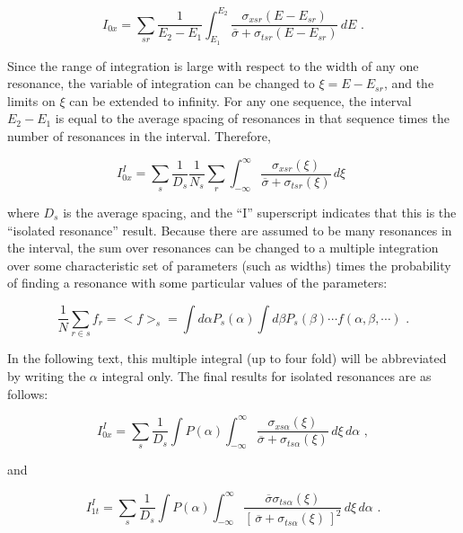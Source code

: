 \begin{equation}
   I_{0x}=\sum_{sr}\frac{1}{E_2-E_1}
     \int_{E_1}^{E_2}\frac{\sigma_{xsr}(E-E_{sr})}
       {\overline{\sigma}+\sigma_{tsr}(E-E_{sr})}\,dE\,\,.
\end{equation}

\noindent
Since the range of integration is large with respect to the width
of any one resonance, the variable of integration can be changed to
$\xi{=}E{-}E_{sr}$, and the limits on $\xi$ can be extended to
infinity.  For any one sequence, the interval $E_2{-}E_1$ is
equal to the average spacing of resonances in that sequence times
the number of resonances in the interval.  Therefore,

\begin{equation}
   I^I_{0x}=\sum_s\frac{1}{D_s}
    \frac{1}{N_s}\sum_r\int_{-\infty}^\infty
      \frac{\sigma_{xsr}(\xi)}
       {\overline{\sigma}+\sigma_{tsr}(\xi)} \,d\xi\,\,
\end{equation}

\noindent
where $D_s$ is the average spacing, and the ``I'' superscript
indicates that this is the ``isolated resonance'' result.
Because there are assumed to be many resonances in the interval,
the sum over resonances can be changed to a multiple integration
over some characteristic set of parameters (such as widths) times
the probability of finding a resonance with some particular
values of the parameters:

\begin{equation}
   \frac{1}{N}\sum_{r\in s}f_r={<}f{>}_s=
    \int d\alpha P_s(\alpha)\int d\beta P_s(\beta)\cdots
         f(\alpha,\beta,\cdots)\,\,.
\end{equation}

\noindent
In the following text, this multiple integral (up to four fold)
will be abbreviated by writing the $\alpha$ integral only.
The final results for isolated resonances are as follows:

\begin{equation}
   I^I_{0x}=\sum_s\frac{1}{D_s}\int P(\alpha)
     \int_{-\infty}^\infty\frac{\sigma_{xs\alpha}(\xi)}
       {\overline{\sigma}+\sigma_{ts\alpha}(\xi)}\,d\xi\,d\alpha\,\,,
\end{equation}

\noindent
and

\begin{equation}
   I^I_{1t}=\sum_s\frac{1}{D_s}\int P(\alpha)
     \int_{-\infty}^\infty\frac{\overline{\sigma}\sigma_{ts\alpha}(\xi)}
       {[\,\overline{\sigma}+\sigma_{ts\alpha}(\xi)\,]^2}\,d\xi\,d\alpha\,\,.
\end{equation}

